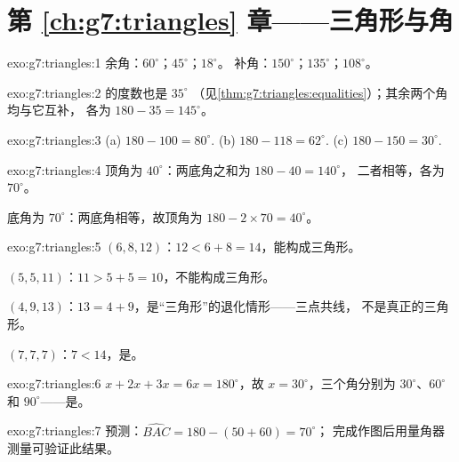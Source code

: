 \section*{第 \ref{ch:g7:triangles} 章——三角形与角}

\begin{solution}{exo:g7:triangles:1}
余角：$60^\circ$；$45^\circ$；$18^\circ$。
补角：$150^\circ$；$135^\circ$；$108^\circ$。
\end{solution}

\begin{solution}{exo:g7:triangles:2}
的度数也是 $35^\circ$
（见\cref{thm:g7:triangles:equalities}）；其余两个角均与它互补，
各为 $180 - 35 = 145^\circ$。
\end{solution}

\begin{solution}{exo:g7:triangles:3}
(a) $180 - 100 = 80^\circ$. \quad
(b) $180 - 118 = 62^\circ$. \quad
(c) $180 - 150 = 30^\circ$.
\end{solution}

\begin{solution}{exo:g7:triangles:4}
顶角为 $40^\circ$：两底角之和为 $180 - 40 = 140^\circ$，
二者相等，各为 $70^\circ$。

底角为 $70^\circ$：两底角相等，故顶角为
$180 - 2 \times 70 = 40^\circ$。
\end{solution}

\begin{solution}{exo:g7:triangles:5}
$(6, 8, 12)$：$12 < 6 + 8 = 14$，能构成三角形。

$(5, 5, 11)$：$11 > 5 + 5 = 10$，不能构成三角形。

$(4, 9, 13)$：$13 = 4 + 9$，是“三角形”的退化情形——三点共线，
不是真正的三角形。

$(7, 7, 7)$：$7 < 14$，是。
\end{solution}

\begin{solution}{exo:g7:triangles:6}
$x + 2x + 3x = 6x = 180^\circ$，故 $x = 30^\circ$，三个角分别为
$30^\circ$、$60^\circ$ 和 $90^\circ$——是。
\end{solution}

\begin{solution}{exo:g7:triangles:7}
预测：$\widehat{BAC} = 180 - (50 + 60) = 70^\circ$；
完成作图后用量角器测量可验证此结果。
\end{solution}

